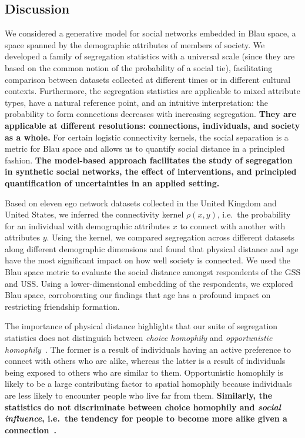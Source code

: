 \documentclass{scrartcl}
\newcommand{\change}[1]{\textbf{#1}}
\begin{document}
\begin{refsection}
\section{Discussion\label{sec:discussion}}

We considered a generative model for social networks embedded in Blau space, a space spanned by the demographic attributes of members of society. We developed a family of segregation statistics with a universal scale (since they are based on the common notion of the probability of a social tie), facilitating comparison between datasets collected at different times or in different cultural contexts. Furthermore, the segregation statistics are applicable to mixed attribute types, have a natural reference point, and an intuitive interpretation: the probability to form connections decreases with increasing segregation. \change{They are applicable at different resolutions: connections, individuals, and society as a whole.} For certain logistic connectivity kernels, the social separation is a metric for Blau space and allows us to quantify social distance in a principled fashion. \change{The model-based approach facilitates the study of segregation in synthetic social networks, the effect of interventions, and principled quantification of uncertainties in an applied setting.}

Based on eleven ego network datasets collected in the United Kingdom and United States, we inferred the connectivity kernel $\rho(x,y)$, i.e.\ the probability for an individual with demographic attributes $x$ to connect with another with attributes $y$. Using the kernel, we compared segregation across different datasets along different demographic dimensions and found that physical distance and age have the most significant impact on how well society is connected. We used the Blau space metric to evaluate the social distance amongst respondents of the GSS and USS. Using a lower-dimensional embedding of the respondents, we explored Blau space, corroborating our findings that age has a profound impact on restricting friendship formation.

The importance of physical distance highlights that our suite of segregation statistics does not distinguish between \emph{choice homophily} and \emph{opportunistic homophily}~\cite{Franz2010}. The former is a result of individuals having an active preference to connect with others who are alike, whereas the latter is a result of individuals being exposed to others who are similar to them. Opportunistic homophily is likely to be a large contributing factor to spatial homophily because individuals are less likely to encounter people who live far from them. \change{Similarly, the statistics do not discriminate between choice homophily and \emph{social influence}, i.e.\ the tendency for people to become more alike given a connection~\cite{Shalizi2011}.}


\end{refsection}
\end{document}
